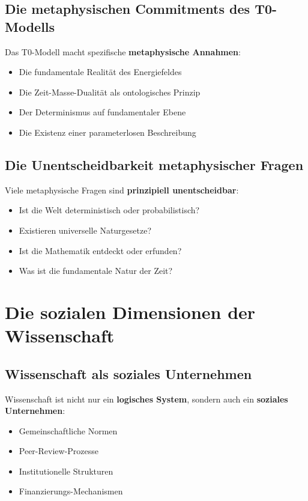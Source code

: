 \documentclass[12pt,a4paper]{report}
\begin{document}
	\subsection{Die metaphysischen Commitments des T0-Modells}
	
	Das T0-Modell macht spezifische \textbf{metaphysische Annahmen}:
	
	\begin{itemize}
		\item Die fundamentale Realität des Energiefeldes
		\item Die Zeit-Masse-Dualität als ontologisches Prinzip
		\item Der Determinismus auf fundamentaler Ebene
		\item Die Existenz einer parameterlosen Beschreibung
	\end{itemize}
	
	\subsection{Die Unentscheidbarkeit metaphysischer Fragen}
	
	Viele metaphysische Fragen sind \textbf{prinzipiell unentscheidbar}:
	
	\begin{itemize}
		\item Ist die Welt deterministisch oder probabilistisch?
		\item Existieren universelle Naturgesetze?
		\item Ist die Mathematik entdeckt oder erfunden?
		\item Was ist die fundamentale Natur der Zeit?
	\end{itemize}
	
	\section{Die sozialen Dimensionen der Wissenschaft}
	
	\subsection{Wissenschaft als soziales Unternehmen}
	
	Wissenschaft ist nicht nur ein \textbf{logisches System}, sondern auch ein \textbf{soziales Unternehmen}:
	
	\begin{itemize}
		\item Gemeinschaftliche Normen
		\item Peer-Review-Prozesse
		\item Institutionelle Strukturen
		\item Finanzierungs-Mechanismen
	\end{itemize}
	
\end{document}
